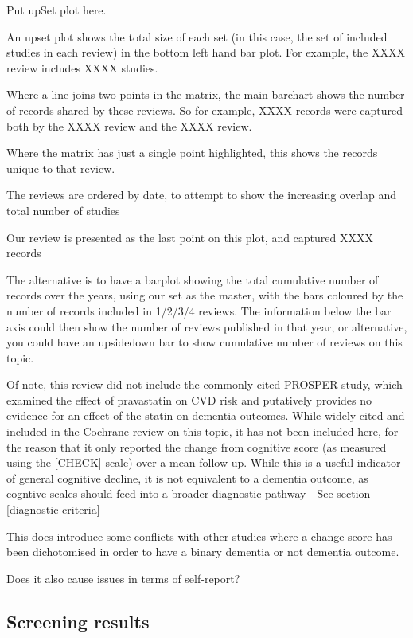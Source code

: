 \documentclass[a4paper, twoside]{templates/ociamthesis}
\begin{document}
Put upSet plot here.

An upset plot shows the total size of each set (in this case, the set of included studies in each review) in the bottom left hand bar plot. For example, the XXXX review includes XXXX studies.

Where a line joins two points in the matrix, the main barchart shows the number of records shared by these reviews. So for example, XXXX records were captured both by the XXXX review and the XXXX review.

Where the matrix has just a single point highlighted, this shows the records unique to that review.

The reviews are ordered by date, to attempt to show the increasing overlap and total number of studies

Our review is presented as the last point on this plot, and captured XXXX records

The alternative is to have a barplot showing the total cumulative number of records over the years, using our set as the master, with the bars coloured by the number of records included in 1/2/3/4 reviews. The information below the bar axis could then show the number of reviews published in that year, or alternative, you could have an upsidedown bar to show cumulative number of reviews on this topic.

Of note, this review did not include the commonly cited PROSPER study, which examined the effect of pravastatin on CVD risk and putatively provides no evidence for an effect of the statin on dementia outcomes. While widely cited and included in the Cochrane review on this topic, it has not been included here, for the reason that it only reported the change from cognitive score (as measured using the {[}CHECK{]} scale) over a mean follow-up. While this is a useful indicator of general cognitive decline, it is not equivalent to a dementia outcome, as cogntive scales should feed into a broader diagnostic pathway - See section \ref{diagnostic-criteria}

This does introduce some conflicts with other studies where a change score has been dichotomised in order to have a binary dementia or not dementia outcome.

Does it also cause issues in terms of self-report?

\hypertarget{screening-results}{%
\subsection{Screening results}\label{screening-results}}
\end{document}
